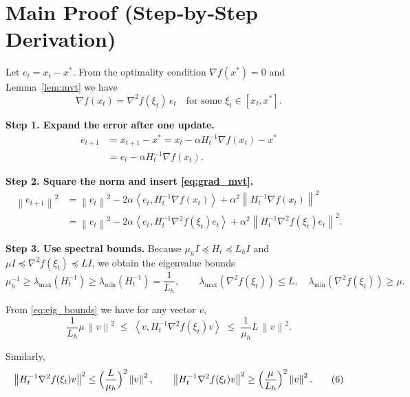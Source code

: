 \documentclass{article}
\newcommand{\norm}[1]{\left\|#1\right\|}
\newcommand{\ip}[2]{\left\langle #1,#2\right\rangle}
\begin{document}
\section*{Main Proof (Step‑by‑Step Derivation)}
Let $e_{t}=x_{t}-x^{*}$.  
From the optimality condition $\nabla f(x^{*})=0$ and Lemma~\ref{lem:mvt} we have
\[
\nabla f(x_{t})=\nabla^{2}f(\xi_{t})\,e_{t}
\quad\text{for some }\xi_{t}\in[x_{t},x^{*}].
\tag{1}
\label{eq:grad_mvt}
\]

\noindent\textbf{Step 1. Expand the error after one update.}
\begin{align}
e_{t+1}
&= x_{t+1}-x^{*}
= x_{t}-\alpha H_{t}^{-1}\nabla f(x_{t})-x^{*}\nonumber\\
&= e_{t}-\alpha H_{t}^{-1}\nabla f(x_{t}).
\tag{2}
\label{eq:error_exp}
\end{align}

\noindent\textbf{Step 2. Square the norm and insert \eqref{eq:grad_mvt}.}
\begin{align}
\norm{e_{t+1}}^{2}
&= \norm{e_{t}}^{2}
-2\alpha\ip{e_{t}}{H_{t}^{-1}\nabla f(x_{t})}
+\alpha^{2}\norm{H_{t}^{-1}\nabla f(x_{t})}^{2}\nonumber\\
&= \norm{e_{t}}^{2}
-2\alpha\ip{e_{t}}{H_{t}^{-1}\nabla^{2}f(\xi_{t})e_{t}}
+\alpha^{2}\norm{H_{t}^{-1}\nabla^{2}f(\xi_{t})e_{t}}^{2}.
\tag{3}
\label{eq:squared}
\end{align}

\noindent\textbf{Step 3. Use spectral bounds.}  
Because $\mu_{h}I\preceq H_{t}\preceq L_{h}I$ and $\mu I\preceq\nabla^{2}f(\xi_{t})\preceq L I$, we obtain the eigenvalue bounds
\[
\mu_{h}^{-1} \ge \lambda_{\max}(H_{t}^{-1})\ge \lambda_{\min}(H_{t}^{-1}) = \frac{1}{L_{h}},
\qquad
\lambda_{\max}(\nabla^{2}f(\xi_{t}))\le L,
\quad
\lambda_{\min}(\nabla^{2}f(\xi_{t}))\ge \mu.
\tag{4}
\label{eq:eig_bounds}
\]

From \eqref{eq:eig_bounds} we have for any vector $v$,
\[
\frac{1}{L_{h}}\mu\,\norm{v}^{2}
\;\le\;
\ip{v}{H_{t}^{-1}\nabla^{2}f(\xi_{t})v}
\;\le\;
\frac{1}{\mu_{h}}L\,\norm{v}^{2}.
\tag{5}
\label{eq:inner_bound}
\]

Similarly,
\[
\norm{H_{t}^{-1}\nabla^{2}f(\xi_{t})v}^{2}
\le
\Bigl(\frac{L}{\mu_{h}}\Bigr)^{2}\norm{v}^{2},
\qquad
\norm{H_{t}^{-1}\nabla^{2}f(\xi_{t})v}^{2}
\ge
\Bigl(\frac{\mu}{L_{h}}\Bigr)^{2}\norm{v}^{2}.
\tag{6}
\label{eq:norm_bound}
\]
\end{document}
